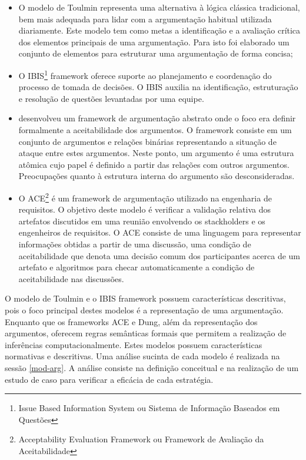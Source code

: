 \begin{itemize}

\item O modelo de Toulmin \cite{toulmin1958uses} representa uma alternativa à lógica clássica tradicional, bem mais adequada para lidar com a argumentação habitual utilizada diariamente. Este modelo tem como metas a identificação e a avaliação crítica dos elementos principais de uma argumentação.  Para isto foi elaborado um conjunto de elementos para estruturar uma argumentação de forma concisa;

\item O IBIS\footnote{Issue Based Information System ou Sistema de Informação Baseados em Questões} \cite{Kunz1970issuesas} framework oferece suporte ao planejamento e coordenação do processo de tomada de decisões. O IBIS auxilia na identificação, estruturação e resolução de questões levantadas por uma equipe.

\item {} desenvolveu um framework de argumentação abstrato onde o foco era definir formalmente a aceitabilidade dos argumentos. O framework consiste em um conjunto de argumentos e relações binárias representando a situação de ataque entre estes argumentos. Neste ponto, um argumento é uma estrutura atômica cujo papel é definido a partir das relações com outros argumentos. Preocupações quanto à estrutura interna do argumento são desconsideradas.

\item O ACE\footnote{Acceptability Evaluation Framework ou Framework de Avaliação da Aceitabilidade} \cite{jureta2009AMA} é um framework de argumentação utilizado na engenharia de requisitos. O objetivo deste modelo é verificar a validação relativa dos artefatos discutidos em uma reunião envolvendo os stackholders e os engenheiros de requisitos. O ACE consiste de uma linguagem para representar informações obtidas a partir de uma discussão, uma condição de aceitabilidade que denota uma decisão comum dos participantes acerca de um artefato e algoritmos para checar automaticamente a condição de aceitabilidade nas discussões. 

\end{itemize}


O modelo de Toulmin e o IBIS framework possuem características descritivas, pois o foco principal destes modelos é a representação de uma argumentação. Enquanto que os frameworks ACE e Dung, além da representação dos argumentos, oferecem regras semânticas formais que permitem a realização de inferências computacionalmente. Estes modelos possuem características normativas e descritivas.	Uma análise sucinta de cada modelo é realizada na sessão \ref{mod-arg}. A análise consiste na definição conceitual e na realização de um estudo de caso para verificar a eficácia de cada estratégia.

